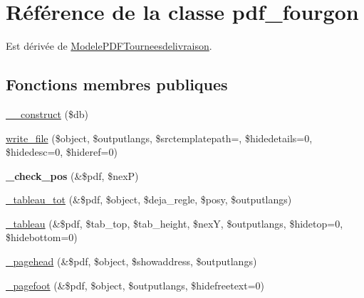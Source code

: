 \hypertarget{classpdf__fourgon}{}\section{Référence de la classe pdf\+\_\+fourgon}
\label{classpdf__fourgon}


Est dérivée de \hyperlink{classModelePDFTourneesdelivraison}{Modele\+P\+D\+F\+Tourneesdelivraison}.

\subsection*{Fonctions membres publiques}
\begin{DoxyCompactItemize}
\item 
\hyperlink{classpdf__fourgon_a1aaf6e41cab8190f5ebb538c12840536}{\+\_\+\+\_\+construct} (\$db)
\item 
\hyperlink{classpdf__fourgon_a65ac34ba26e8f01e3cfbbdd966498b85}{write\+\_\+file} (\$object, \$outputlangs, \$srctemplatepath=\textquotesingle{}\textquotesingle{}, \$hidedetails=0, \$hidedesc=0, \$hideref=0)
\item 
\mbox{\label{classpdf__fourgon_aeef30fc7ab9c489f76e9aa3d136b13b9}} 
{\bfseries \+\_\+check\+\_\+pos} (\&\$pdf, \$nexP)
\item 
\hyperlink{classpdf__fourgon_afda3c9e7e9ca0c4c98b65042cd71d93f}{\+\_\+tableau\+\_\+tot} (\&\$pdf, \$object, \$deja\+\_\+regle, \$posy, \$outputlangs)
\item 
\hyperlink{classpdf__fourgon_acbc6c3c03c8430b76a39850ceed477b6}{\+\_\+tableau} (\&\$pdf, \$tab\+\_\+top, \$tab\+\_\+height, \$nexY, \$outputlangs, \$hidetop=0, \$hidebottom=0)
\item 
\hyperlink{classpdf__fourgon_afe08036e60f2af973a74f829f3a1f4b6}{\+\_\+pagehead} (\&\$pdf, \$object, \$showaddress, \$outputlangs)
\item 
\hyperlink{classpdf__fourgon_a4f58b9c60b66d1d94ba6752a25993713}{\+\_\+pagefoot} (\&\$pdf, \$object, \$outputlangs, \$hidefreetext=0)
\end{DoxyCompactItemize}

